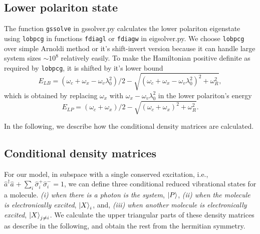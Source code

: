 \documentclass[final,twocolumn]{elsarticle}
\newcommand{\ad}{\hat{a}^\dagger}
\newcommand{\an}{\hat{a}^{}}
\newcommand{\az}[1]{{\color{magenta}{#1}}}
\begin{document}
\begin{small}
\az{should i include details that should go in `user manual'??, e.g., file names, function names?}





\section{Lower polariton state}

The function 
\texttt{gssolve} in gssolver.py
calculates the
lower polariton eigenstate using \texttt{lobpcg}
in functions 
\texttt{fdiagl} or \texttt{fdiagw}
in eigsolver.py.
We choose \texttt{lobpcg} over 
simple Arnoldi method or it's shift-invert version \cite{arnoldi} because it
can handle large system sizes $\sim 10^8$ relatively easily.
To make the Hamiltonian positive definite as required by \texttt{lobpcg},
it is shifted by it's lower bound
\begin{displaymath}
E_{LB}=(\omega_c+\omega_x-\omega_v \lambda_0^2)/2
-\sqrt{(\omega_c+\omega_x-\omega_v\lambda_0^2)^2 + \omega_R^2},
\end{displaymath}
which is obtained by replacing 
$\omega_x$ with
$\omega_x-\omega_v \lambda_0^2$
in 
the lower polariton's
energy
\begin{displaymath}
E_{LP}=(\omega_c+\omega_x)/2-\sqrt{(\omega_c+\omega_x)^2 + \omega_R^2}.
\end{displaymath}

In the following, we describe how the conditional density matrices are calculated.

\subsection{Conditional density matrices}

For our model, in subspace with a single conserved excitation,
i.e.,
$\ad \an+ \sum_i \hat \sigma^+_i \hat \sigma^-_i = 1$,
we can define three conditional reduced vibrational states
for a molecule.
{ \it(i) when there is a photon is the system}, $\ket{P}$,
{ \it(ii) when the molecule is electronically excited}, $\ket{X}_i$, and, 
{ \it(iii) when 
another molecule is electronically excited}, $\ket{X}_{j\neq i}$.
We calculate the upper triangular parts of these density matrices 
as describe in the following,
and obtain the rest from the hermitian symmetry.


\end{small}
\end{document}
